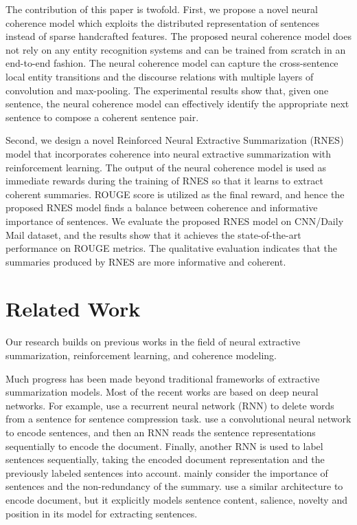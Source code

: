 	The contribution of this paper is twofold. First, we propose a novel neural coherence model which exploits the distributed representation of sentences instead of sparse handcrafted features. The proposed neural coherence model does not rely on any entity recognition systems and can be trained from scratch in an end-to-end fashion. The neural coherence model can capture the cross-sentence local entity transitions and the discourse relations with multiple layers of convolution and max-pooling. The experimental results show that, given one sentence, the neural coherence model can effectively identify the appropriate next sentence to compose a coherent sentence pair.

	Second, we design a novel Reinforced Neural Extractive Summarization (RNES) model that incorporates coherence into neural extractive summarization with reinforcement learning. The output of the neural coherence model is used as immediate rewards during the training of RNES so that it learns to extract coherent summaries. ROUGE score is utilized as the final reward, and hence the proposed RNES model finds a balance between coherence and informative importance of sentences. We evaluate the proposed RNES model on CNN/Daily Mail dataset, and the results show that it achieves the state-of-the-art performance on ROUGE metrics. The qualitative evaluation indicates that the summaries produced by RNES are more informative and coherent.

	\section{Related Work} Our research builds on previous works in the field of neural extractive summarization, reinforcement learning, and coherence modeling.

	Much progress has been made beyond traditional frameworks of extractive summarization models. Most of the recent works are based on deep neural networks. For example, \cite{filippova_sentence_2015} use a recurrent neural network (RNN) to delete words from a sentence for sentence compression task. \cite{jianpeng2016} use a convolutional neural network to encode sentences, and then an RNN reads the sentence representations sequentially to encode the document. Finally, another RNN is used to label sentences sequentially, taking the encoded document representation and the previously labeled sentences into account. \cite{jianpeng2016} mainly consider the importance of sentences and the non-redundancy of the summary. \cite{SummaRuNNer} use a similar architecture to encode document, but it explicitly models sentence content, salience, novelty and position in its model for extracting sentences.

